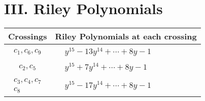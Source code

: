 \documentclass[1p]{elsarticle_modified}
\theoremstyle{definition}
\begin{document}
\centering \section*{ III. Riley Polynomials}
\begin{tabular}{m{50pt}|m{274pt}}
Crossings & \hspace{64pt}Riley Polynomials at each crossing \\
\hline $$\begin{aligned}c_{1},c_{6},c_{9}\end{aligned}$$&$\begin{aligned}
&y^{15}-13 y^{14}+\cdots+8 y-1
\end{aligned}$\\
\hline $$\begin{aligned}c_{2},c_{5}\end{aligned}$$&$\begin{aligned}
&y^{15}+7 y^{14}+\cdots+8 y-1
\end{aligned}$\\
\hline $$\begin{aligned}c_{3},c_{4},c_{7}\\c_{8}\end{aligned}$$&$\begin{aligned}
&y^{15}-17 y^{14}+\cdots+8 y-1
\end{aligned}$\\
\hline
\end{tabular}
\vskip 2pc
\end{document}
